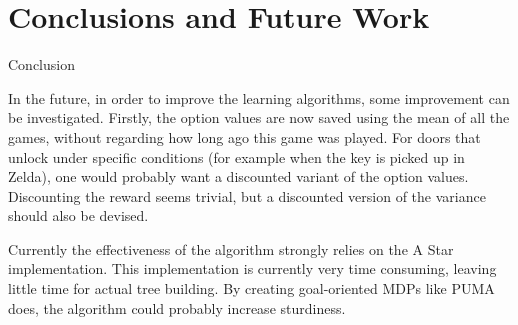 \section{Conclusions and Future Work}
\label{sec:conclusion}
Conclusion

In the future, in order to improve the learning algorithms, some improvement can
be investigated. Firstly, the option values are now saved using the mean of all
the games, without regarding how long ago this game was played. For doors that
unlock under specific conditions (for example when the key is picked up in
Zelda), one would probably want a discounted variant of the option values.
Discounting the reward seems trivial, but a discounted version of the variance
should also be devised.

Currently the effectiveness of the algorithm strongly relies on the A Star
implementation. This implementation is currently very time consuming, leaving
little time for actual tree building. By creating goal-oriented MDPs like PUMA
does, the algorithm could probably increase sturdiness. 
